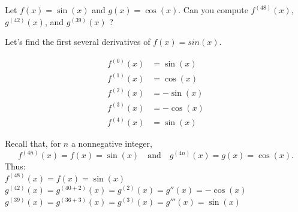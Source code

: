 \documentclass[nooutcomes]{ximera}
\begin{document}
\begin{problem}
Let $f(x) = \sin(x)$ and $g(x) = \cos(x)$.  Can you compute $f^{(48)}(x)$, $g^{(42)}(x)$, and $g^{(39)}(x)$ ?  

\begin{freeResponse}
Let's find the first several derivatives of $f(x)=sin(x)$.

	\begin{align*}
	f^{(0)}(x)&=\sin(x)\\
	f^{(1)}(x)&=\cos(x)\\
	f^{(2)}(x)&=-\sin(x)\\
	f^{(3)}(x)&=-\cos(x)\\
	f^{(4)}(x)&=\sin(x)
	\end{align*}

  Recall that, for $n$ a nonnegative integer,
  $$f^{(4n)}(x) = f(x) = \sin(x) \quad \text{and} \quad g^{(4n)}(x) = g(x) = \cos(x).$$
  Thus: \\ 
  $f^{(48)}(x) =f(x)= \sin(x)$ \\
 $g^{(42)}(x) =g^{(40+2)}(x)= g^{(2)}(x) = g''(x) = - \cos(x)$  \\
$g^{(39)}(x) =g^{(36+3)}(x)= g^{(3)}(x) = g'''(x) = \sin(x)$  



\end{freeResponse}

\end{problem}
	



	
	
			



		
\end{document}

